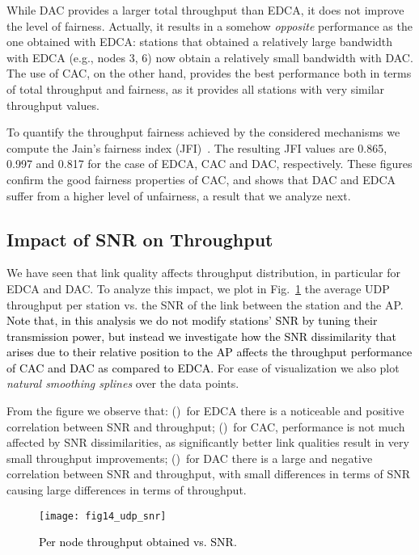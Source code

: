 \documentclass[a4paper,10pt]{article}
\newcommand{\revs}[1]{\textcolor{black}{#1}}
\begin{document}
While DAC provides a larger total throughput than EDCA, it does not improve the level of fairness. Actually, it results in a somehow \emph{opposite} performance as the one obtained with EDCA: stations that obtained a relatively large bandwidth with EDCA (e.g., nodes 3, 6) now obtain a relatively small bandwidth with DAC. The use of CAC, on the other hand, provides the best performance both in terms of total throughput and fairness, as it provides all stations with very similar throughput values. 

To quantify the throughput fairness achieved by the considered mechanisms we compute the Jain's fairness index (JFI)~\cite{jain84}. The resulting JFI values are 0.865, 0.997 and 0.817 for the case of EDCA, CAC and DAC, respectively. These figures confirm the good fairness properties of CAC, and shows that DAC and EDCA suffer from a higher level of unfairness, a result that we analyze next. 

\subsection{Impact of SNR on Throughput}
\label{sec:snr}

We have seen that link quality affects throughput distribution, in particular for EDCA and DAC. To analyze this impact, we plot in Fig.~\ref{fig:throughput_snr} the average UDP throughput per station vs. the SNR of the link between the station and the AP. \revs{Note that, in this analysis we do not modify stations' SNR by tuning their transmission power, but instead we investigate how the SNR dissimilarity that arises due to their relative position to the AP affects the throughput performance of CAC and DAC as compared to EDCA.} For ease of visualization we also plot \emph{natural smoothing splines} over the data points. 

From the figure we observe that: ()~for EDCA there is a noticeable and positive correlation between SNR and throughput; ()~for CAC, performance is not much affected by SNR dissimilarities, as significantly better link qualities result in very small throughput improvements; ()~for DAC there is a large and negative correlation between SNR and throughput, with small differences in terms of SNR causing large differences in terms of throughput.  

\begin{figure}\texttt{[image: fig14\_udp\_snr]}\caption{\revs{Per node throughput obtained vs. SNR.}}\label{fig:throughput_snr}\end{figure}
\end{document}
